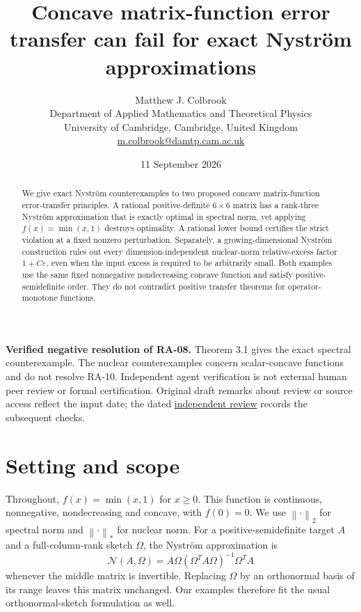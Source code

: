 \documentclass[11pt]{article}
\title{Concave matrix-function error transfer can fail for exact Nystr\"om approximations}
\author{Matthew J. Colbrook\\\small Department of Applied Mathematics and Theoretical Physics\\\small University of Cambridge, Cambridge, United Kingdom\\\small\href{mailto:m.colbrook@damtp.cam.ac.uk}{m.colbrook@damtp.cam.ac.uk}}
\date{11 September 2026}
\theoremstyle{definition}
\newcommand{\norm}[1]{\left\lVert#1\right\rVert}
\newcommand{\eps}{\varepsilon}
\begin{document}
\maketitle

\noindent\textbf{Verified negative resolution of RA-08.} Theorem 3.1 gives the exact spectral counterexample. The nuclear counterexamples concern scalar-concave functions and do not resolve RA-10.
Independent agent verification is not external human peer review or formal certification. Original draft remarks about review or source access reflect the input date; the dated \href{https://github.com/MColbrook/OpenProblemsInNLA/blob/codex/colbrook-transfer-resolutions/references/colbrook-transfer-2026-09-11/verification/reviews/RA-08-review.md}{independent review} records the subsequent checks.
\par\medskip
\begin{abstract}
We give exact Nystr\"om counterexamples to two proposed concave matrix-function error-transfer principles. A rational positive-definite $6\times6$ matrix has a rank-three Nystr\"om approximation that is exactly optimal in spectral norm, yet applying $f(x)=\min(x,1)$ destroys optimality. A rational lower bound certifies the strict violation at a fixed nonzero perturbation. Separately, a growing-dimensional Nystr\"om construction rules out every dimension-independent nuclear-norm relative-excess factor $1+C\eps$, even when the input excess is required to be arbitrarily small. Both examples use the same fixed nonnegative nondecreasing concave function and satisfy positive-semidefinite order. They do not contradict positive transfer theorems for operator-monotone functions.
\end{abstract}

\section{Setting and scope}
Throughout, $f(x)=\min(x,1)$ for $x\ge0$. This function is continuous, nonnegative, nondecreasing and concave, with $f(0)=0$. We use $\norm\cdot_2$ for spectral norm and $\norm\cdot_*$ for nuclear norm. For a positive-semidefinite target $A$ and a full-column-rank sketch $\Omega$, the Nystr\"om approximation is
\[
 \mathcal N(A,\Omega)=A\Omega(\Omega^TA\Omega)^{-1}\Omega^TA
\]
whenever the middle matrix is invertible. Replacing $\Omega$ by an orthonormal basis of its range leaves this matrix unchanged. Our examples therefore fit the usual orthonormal-sketch formulation as well.
\end{document}

